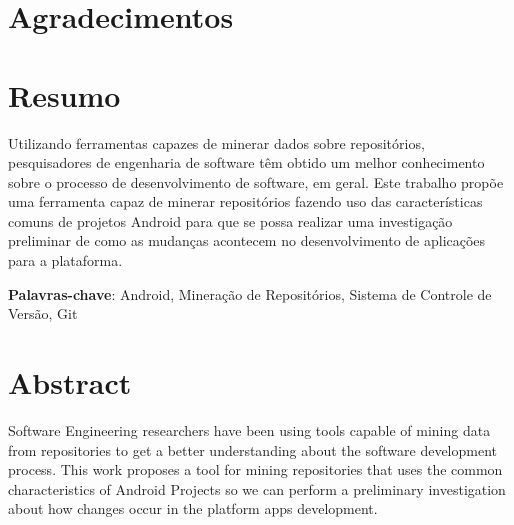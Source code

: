\documentclass[a4paper,12pt]{article}
\numberwithin{figure}{section}
\begin{document}
\newpage
\section*{Agradecimentos}


\newpage
{} %
\section*{Resumo}
Utilizando ferramentas capazes de minerar dados sobre repositórios, pesquisadores de engenharia de software têm obtido um melhor conhecimento sobre o processo de desenvolvimento de software, em geral. Este trabalho propõe uma ferramenta capaz de minerar repositórios fazendo uso das características comuns de projetos Android para que se possa realizar uma investigação preliminar de como as mudanças acontecem no desenvolvimento de aplicações para a plataforma.

\textbf{Palavras-chave}: Android, Mineração de Repositórios, Sistema de Controle de Versão, Git

\newpage
\section*{Abstract}

Software Engineering researchers have been using tools capable of mining data from repositories to get a better understanding about the software development process. This work proposes a tool for mining repositories that uses the common characteristics of Android Projects so we can perform a preliminary investigation about how changes occur in the platform apps development.
\end{document}
